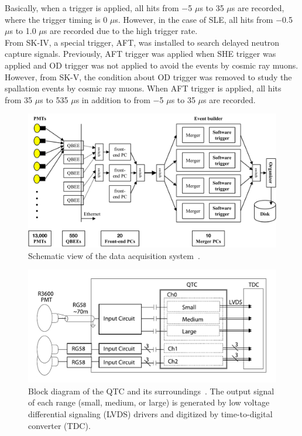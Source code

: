 Basically, when a trigger is applied, all hits from $-$5 $\mu$s to 35 $\mu$s are recorded, where the trigger timing is 0 $\mu$s.
However, in the case of SLE, all hits from $-$0.5 $\mu$s to 1.0 $\mu$s are recorded due to the high trigger rate.\\
\hs From SK-IV, a special trigger, AFT, was installed to search delayed neutron capture signals.
Previously, AFT trigger was applied when SHE trigger was applied and OD trigger was not applied to avoid the events by cosmic ray muons.
However, from SK-V, the condition about OD trigger was removed to study the spallation events by cosmic ray muons.
When AFT trigger is applied, all hits from 35 $\mu$s to 535 $\mu$s in addition to from $-$5 $\mu$s to 35 $\mu$s are recorded.

\begin{figure}[h]
	\centering
	\includegraphics[width=12cm]{Figures/SK/DAQ}
	\caption[Schematic view of the data acquisition system]{\label{SK_DAQ} Schematic view of the data acquisition system~\cite{2010Yamada}.}
\end{figure}

\begin{figure}[h]
	\centering
	\includegraphics[width=12cm]{Figures/SK/QTC}
	\caption[Block diagram of the QTC and its surroundings]{\label{SK_QTC} Block diagram of the QTC and its surroundings~\cite{2009Nishino}. The output signal of each range (small, medium, or large) is generated by low voltage differential signaling (LVDS) drivers and digitized by time-to-digital converter (TDC).}
\end{figure}

